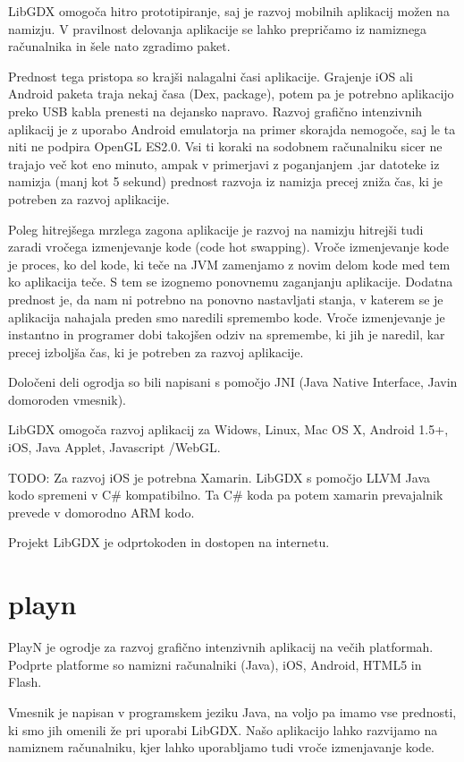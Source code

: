 LibGDX omogoča hitro prototipiranje, saj je razvoj mobilnih aplikacij možen na namizju. V pravilnost delovanja aplikacije se lahko prepričamo iz namiznega računalnika in šele nato zgradimo paket. 

Prednost tega pristopa so krajši nalagalni časi aplikacije. Grajenje iOS ali Android paketa traja nekaj časa (Dex, package), potem pa je potrebno aplikacijo preko USB kabla prenesti na dejansko napravo. Razvoj grafično intenzivnih aplikacij je z uporabo Android emulatorja na primer skorajda nemogoče, saj le ta niti ne podpira OpenGL ES2.0. Vsi ti koraki na sodobnem računalniku sicer ne trajajo več kot eno minuto, ampak v primerjavi z poganjanjem .jar datoteke iz namizja (manj kot 5 sekund) prednost razvoja iz namizja precej zniža čas, ki je potreben za razvoj aplikacije.

Poleg hitrejšega mrzlega zagona aplikacije je razvoj na namizju hitrejši tudi zaradi vročega izmenjevanje kode (code hot swapping). Vroče izmenjevanje kode je proces, ko del kode, ki teče na JVM zamenjamo z novim delom kode med tem ko aplikacija teče. S tem se izognemo ponovnemu zaganjanju aplikacije. Dodatna prednost je, da nam ni potrebno na ponovno nastavljati stanja, v katerem se je aplikacija nahajala preden smo naredili spremembo kode. Vroče izmenjevanje je instantno in programer dobi takojšen odziv na spremembe, ki jih je naredil, kar precej izboljša čas, ki je potreben za razvoj aplikacije.

Določeni deli ogrodja so bili napisani s pomočjo JNI (Java Native Interface, Javin domoroden vmesnik).

LibGDX omogoča razvoj aplikacij za Widows, Linux, Mac OS X, Android 1.5+, iOS, Java Applet, Javascript /WebGL. 

TODO: Za razvoj iOS je potrebna Xamarin. LibGDX s pomočjo LLVM Java kodo spremeni v C\# kompatibilno. Ta C\# koda pa potem xamarin prevajalnik prevede v domorodno ARM kodo.

Projekt LibGDX je odprtokoden in dostopen na internetu.

\section{playn\cite{playn}}

PlayN je ogrodje za razvoj grafično intenzivnih aplikacij na večih platformah. Podprte platforme so namizni računalniki (Java), iOS, Android, HTML5 in Flash.

Vmesnik je napisan v programskem jeziku Java, na voljo pa imamo vse prednosti, ki smo jih omenili že pri uporabi LibGDX. Našo aplikacijo lahko razvijamo na namiznem računalniku, kjer lahko uporabljamo tudi vroče izmenjavanje kode. 

